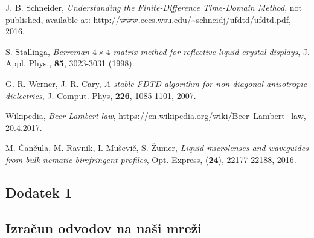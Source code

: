 \documentclass[longbibliography,slovene,a4paper,12pt]{book}
\begin{document}
\begin{thebibliography}{15}
	J. B. Schneider,
	\emph{Understanding the Finite-Difference Time-Domain Method},
	not published, available at: \url{http://www.eecs.wsu.edu/~schneidj/ufdtd/ufdtd.pdf}, 2016.

	S. Stallinga,
	\emph{Berreman $4 \times 4$ matrix method for reflective liquid crystal displays},
	J. Appl. Phys., \textbf{85}, 3023-3031 (1998).

	G. R. Werner, J. R. Cary,
	\emph{A stable FDTD algorithm for non-diagonal anisotropic dielectrics},
	J. Comput. Phys, \textbf{226}, 1085-1101, 2007.
	 
	Wikipedia, \emph{Beer-Lambert law},
	\url{https://en.wikipedia.org/wiki/Beer–Lambert_law}, 20.4.2017.


	M. Čančula, M. Ravnik, I. Muševič, S. Žumer,
	\emph{Liquid microlenses and waveguides from bulk nematic birefringent profiles},
	Opt. Express, (\textbf{24}), 22177-22188, 2016.


\end{thebibliography}



\cleardoublepage
\renewcommand\appendixname{Dodatek}
\begin{appendices}

\chapter{Dodatek 1}
\section{Izračun odvodov na naši mreži}
    
    

\end{appendices}


\cleardoublepage
\printindex
\end{document}
